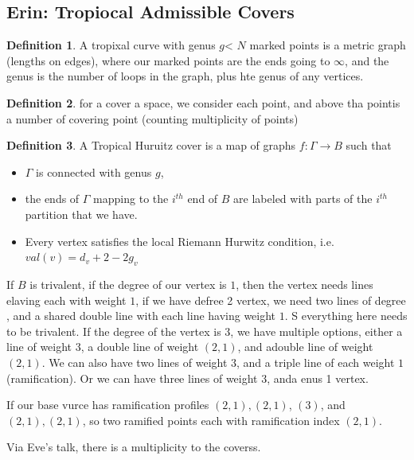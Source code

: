 \documentclass[12pt]{memoir}
\theoremstyle{definition}
\newtheorem{protodefinition}{Definition}[section]
\newenvironment{define}
   {\begin{protodefinition}}
   {\end{protodefinition}}
\begin{document}
\subsection{Erin: Tropiocal Admissible Covers}

\begin{define}
    A tropixal curve with genus $g$< $N$ marked points is a metric graph (lengths on edges), where our marked points are the ends going to $\infty$, and the genus is the number of loops in the graph, plus hte genus of any vertices.
\end{define}

\begin{define}
    for a cover a space, we consider each point, and above tha pointis a  number of covering point (counting multiplicity of points)
\end{define}



\begin{define}
    A Tropical Huruitz cover is a map of graphs $f: \Gamma \rightarrow B$ such that
    \begin{itemize}
        \item $\Gamma$ is connected with genus $g$,
        \item the ends of $\Gamma$ mapping to the $i^{th}$ end of $B$ are labeled with parts of the $i^{th}$ partition that we have.
        \item Every vertex satisfies the local Riemann Hurwitz condition, i.e. $val(v) = d_v+2-2g_v$
    \end{itemize}
\end{define}



If $B$ is trivalent, if the degree of our vertex is $1$, then the vertex needs lines elaving each with weight $1$, if we have defree 2 vertex, we need two lines of degree , and a shared double line with each line having weight $1$. S everything here needs to be trivalent. If the degree of the vertex is $3$, we have multiple options, either a line of weight 3, a double line of weight $(2,1)$, and adouble line of weight $(2,1)$. We can also have two lines of weight $3$, and a triple line of each weight $1$ (ramification). Or we can have three lines of weight $3$, anda  enus 1 vertex.


If our base vurce has ramification profiles $(2,1),(2,1)$, $(3)$, and $(2,1),(2,1)$, so two ramified points each with ramification index $(2,1)$. 

Via Eve's talk, there is a multiplicity to the coverss.
\end{document}

